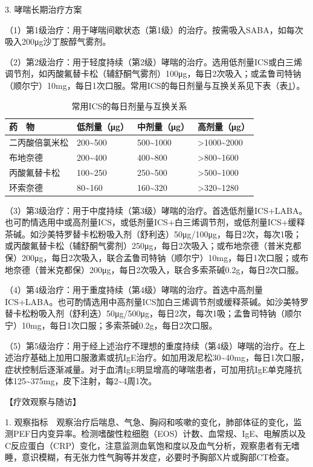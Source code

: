 3. 哮喘长期治疗方案

（1）第1级治疗：用于哮喘间歇状态（第1级）的治疗。按需吸入SABA，如每次吸入200μg沙丁胺醇气雾剂。

（2）第2级治疗：用于轻度持续（第2级）哮喘的治疗。选用低剂量ICS或白三烯调节剂，如丙酸氟替卡松（辅舒酮气雾剂）100μg，每日2次吸入；或孟鲁司特钠（顺尔宁）10mg，每日1次口服。常用ICS的每日剂量与互换关系见下表（表\ref{tab1-6-1}）。


\begin{longtable}[]{@{}llll@{}}
  \caption{常用ICS的每日剂量与互换关系}
  \label{tab1-6-1}\\
\toprule
药　物 & 低剂量（μg） & 中剂量（μg） & 高剂量（μg）\tabularnewline
\midrule
\endhead
二丙酸倍氯米松 & 200\textasciitilde{}500 & 500\textasciitilde{}1000 &
\textgreater{}1000\textasciitilde{}2000\tabularnewline
布地奈德 & 200\textasciitilde{}400 & 400\textasciitilde{}800 &
\textgreater{}800\textasciitilde{}1600\tabularnewline
丙酸氟替卡松 & 100\textasciitilde{}250 & 250\textasciitilde{}500 &
\textgreater{}500\textasciitilde{}1000\tabularnewline
环索奈德 & 80\textasciitilde{}160 & 160\textasciitilde{}320 &
\textgreater{}320\textasciitilde{}1280\tabularnewline
\bottomrule
\end{longtable}

（3）第3级治疗：用于中度持续（第3级）哮喘的治疗。首选低剂量ICS+LABA。也可酌情选用中或高剂量ICS，或低剂量ICS+白三烯调节剂，或低剂量ICS+缓释茶碱。如沙美特罗替卡松粉吸入剂（舒利迭）50μg/100μg，每日2次，每次1吸；或丙酸氟替卡松（辅舒酮气雾剂）250μg，每日2次吸入；或布地奈德（普米克都保）200μg，每日2次吸入，联合孟鲁司特钠（顺尔宁）10mg，每日1次口服；或布地奈德（普米克都保）200μg，每日2次吸入，联合多索茶碱0.2g，每日2次口服。

（4）第4级治疗：用于重度持续（第4级）哮喘的治疗。首选中高剂量ICS+LABA。也可酌情选用中高剂量ICS加白三烯调节剂或缓释茶碱。如沙美特罗替卡松粉吸入剂（舒利迭）50μg/500μg，每日2次，每次1吸；孟鲁司特钠（顺尔宁）10mg，每日1次口服；多索茶碱0.2g，每日2次口服。

（5）第5级治疗：用于经上述治疗不理想的重度持续（第4级）哮喘的治疗。在上述治疗基础上加用口服激素或抗IgE治疗。如加用泼尼松30\textasciitilde{}40mg，每日1次口服，症状控制后逐渐减量。对于血清IgE明显增高的哮喘患者，可加用抗IgE单克隆抗体125\textasciitilde{}375mg，皮下注射，每2\textasciitilde{}4周1次。

【疗效观察与随访】

1.
观察指标　观察治疗后喘息、气急、胸闷和咳嗽的变化，肺部体征的变化，监测PEF日内变异率。检测嗜酸性粒细胞（EOS）计数、血常规、IgE、电解质以及C反应蛋白（CRP）变化，注意监测血氧饱和度以及血气分析，观察患者有无嗜睡，意识模糊，有无张力性气胸等并发症，必要时予胸部X片或胸部CT检查。

